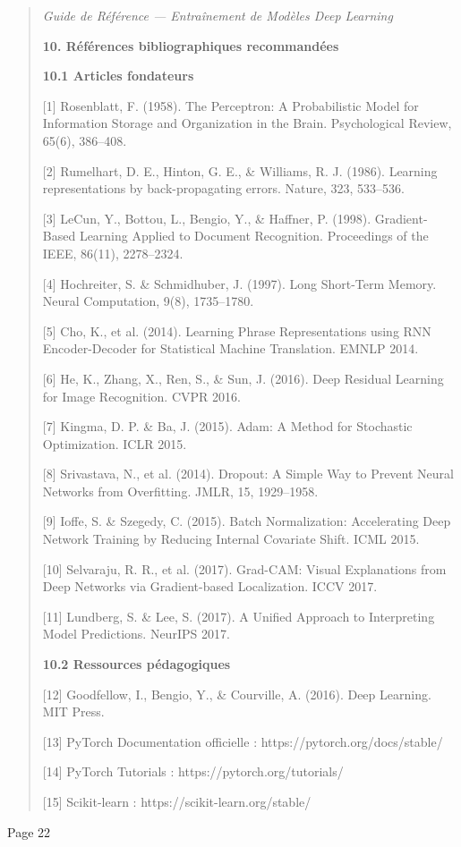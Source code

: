 \documentclass[
]{article}
\begin{document}
\begin{quote}
\emph{Guide de Référence --- Entraînement de Modèles Deep Learning}

\textbf{10. Références bibliographiques recommandées}

\textbf{10.1 Articles fondateurs}

{[}1{]} Rosenblatt, F. (1958). The Perceptron: A Probabilistic Model for
Information Storage and Organization in the Brain. Psychological Review,
65(6), 386--408.

{[}2{]} Rumelhart, D. E., Hinton, G. E., \& Williams, R. J. (1986).
Learning representations by back-propagating errors. Nature, 323,
533--536.

{[}3{]} LeCun, Y., Bottou, L., Bengio, Y., \& Haffner, P. (1998).
Gradient-Based Learning Applied to Document Recognition. Proceedings of
the IEEE, 86(11), 2278--2324.

{[}4{]} Hochreiter, S. \& Schmidhuber, J. (1997). Long Short-Term
Memory. Neural Computation, 9(8), 1735--1780.

{[}5{]} Cho, K., et al. (2014). Learning Phrase Representations using
RNN Encoder-Decoder for Statistical Machine Translation. EMNLP 2014.

{[}6{]} He, K., Zhang, X., Ren, S., \& Sun, J. (2016). Deep Residual
Learning for Image Recognition. CVPR 2016.

{[}7{]} Kingma, D. P. \& Ba, J. (2015). Adam: A Method for Stochastic
Optimization. ICLR 2015.

{[}8{]} Srivastava, N., et al. (2014). Dropout: A Simple Way to Prevent
Neural Networks from Overfitting. JMLR, 15, 1929--1958.

{[}9{]} Ioffe, S. \& Szegedy, C. (2015). Batch Normalization:
Accelerating Deep Network Training by Reducing Internal Covariate Shift.
ICML 2015.

{[}10{]} Selvaraju, R. R., et al. (2017). Grad-CAM: Visual Explanations
from Deep Networks via Gradient-based Localization. ICCV 2017.

{[}11{]} Lundberg, S. \& Lee, S. (2017). A Unified Approach to
Interpreting Model Predictions. NeurIPS 2017.

\textbf{10.2 Ressources pédagogiques}

{[}12{]} Goodfellow, I., Bengio, Y., \& Courville, A. (2016). Deep
Learning. MIT Press.

{[}13{]} PyTorch Documentation officielle :
https://pytorch.org/docs/stable/

{[}14{]} PyTorch Tutorials : https://pytorch.org/tutorials/

{[}15{]} Scikit-learn : https://scikit-learn.org/stable/
\end{quote}

Page 22
\end{document}
